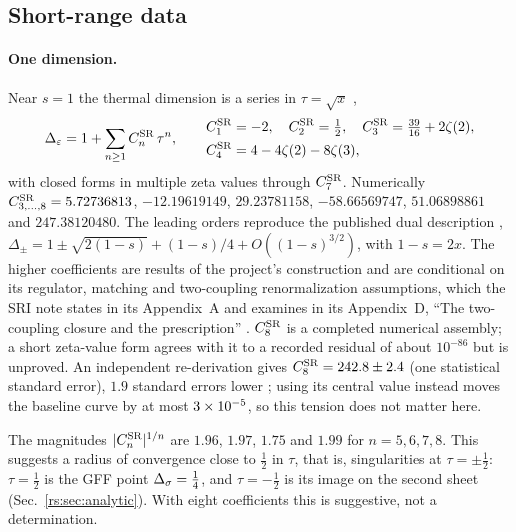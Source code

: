 \subsection{Short-range data}\label{rs:sec:srdata}
\paragraph{One dimension.} Near $s=1$ the thermal dimension is a series in
$\tau=\sqrt{x}$ \cite{rs:noteSRI},
\begin{equation}
 \Delta_\varepsilon=1+\sum_{n\ge1}C^{\mathrm{SR}}_n\,\tau^n,\qquad
 \begin{aligned}
 &C^{\mathrm{SR}}_1=-2,\quad C^{\mathrm{SR}}_2=\tfrac12,\quad C^{\mathrm{SR}}_3=\tfrac{39}{16}+2\zeta(2),\\
 &C^{\mathrm{SR}}_4=4-4\zeta(2)-8\zeta(3),
 \end{aligned}
 \label{rs:eq:SRseries}
\end{equation}
with closed forms in multiple zeta values through $C^{\mathrm{SR}}_7$. Numerically
$C^{\mathrm{SR}}_{3,\dots,8}=5.72736813$, $-12.19619149$, $29.23781158$, $-58.66569747$,
$51.06898861$ and $247.38120480$. The leading orders reproduce the published
dual description \cite{rs:Benedetti:2024wgx,rs:Benedetti:2025nzp},
$\Delta_\pm=1\pm\sqrt{2(1-s)}+(1-s)/4+O((1-s)^{3/2})$, with $1-s=2x$. The higher
coefficients are results of the project's construction and are conditional on its
regulator, matching and two-coupling renormalization assumptions, which the SRI note states
in its Appendix~A and examines in its Appendix~D, ``The two-coupling closure and the
prescription'' \cite{rs:noteSRI}.
$C^{\mathrm{SR}}_8$ is a completed numerical assembly; a short zeta-value form agrees with it to a
recorded residual of about $10^{-86}$ but is unproved. An independent re-derivation gives
$C^{\mathrm{SR}}_8=242.8\pm2.4$ (one statistical standard error), $1.9$ standard errors lower
\cite{rs:noteSRI}; using its central value instead moves the baseline curve by at most
$3\times10^{-5}$, so this tension does not matter here.

The magnitudes $|C^{\mathrm{SR}}_n|^{1/n}$ are $1.96$, $1.97$, $1.75$ and $1.99$ for $n=5,6,7,8$.
This suggests a radius of convergence close to $\frac12$ in $\tau$, that is, singularities
at $\tau=\pm\frac12$: $\tau=\frac12$ is the GFF point $\Delta_\sigma=\frac14$, and $\tau=-\frac12$ is its
image on the second sheet (Sec.~\ref{rs:sec:analytic}). With eight coefficients this is
suggestive, not a determination.

